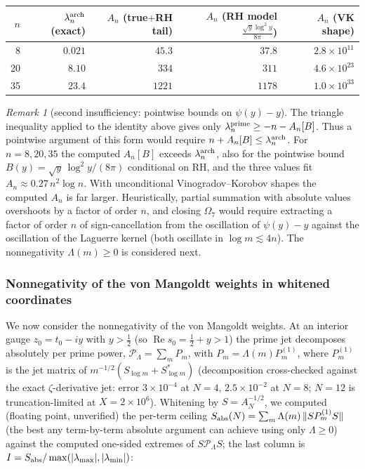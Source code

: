 \documentclass[11pt]{amsart}
\theoremstyle{definition}
\theoremstyle{remark}
\newtheorem{remark}[theorem]{Remark}
\theoremstyle{definition}
\renewcommand{\Re}{\operatorname{Re}}
\begin{document}
\begin{center}\small
\begin{tabular}{r|rrrr}
$n$ & $\lambda_n^{\rm arch}$ (exact) & $A_n$ (true$+$RH tail) & $A_n$ (RH model $\tfrac{\sqrt y\log^2y}{8\pi}$) & $A_n$ (VK shape) \\\hline
 8 & $0.021$ & $45.3$ & $37.8$ & $2.8\times10^{11}$\\
20 & $8.10$ & $334$  & $311$  & $4.6\times10^{23}$\\
35 & $23.4$ & $1221$ & $1178$ & $1.0\times10^{33}$\\
\end{tabular}
\end{center}

\begin{remark}[second insufficiency: pointwise bounds on $\psi(y)-y$]\label{rmk:pointwise-insufficient}
The triangle inequality applied to the identity above gives only
$\lambda_n^{\rm prime}\ge-n-A_n[B]$.  Thus a pointwise argument of this form would require
$n+A_n[B]\le\lambda_n^{\rm arch}$.  For $n=8,20,35$ the computed $A_n[B]$ exceeds $\lambda_n^{\rm arch}$, also for the
pointwise bound $B(y)=\sqrt y\,\log^2y/(8\pi)$ conditional on RH, and the three values fit
$A_n\approx0.27\,n^2\log n$.  With unconditional Vinogradov--Korobov shapes the computed $A_n$ is
far larger.  Heuristically, partial summation with absolute values overshoots by a factor of order
$n$, and closing $\Omega_7$ would require extracting a factor of order $n$ of sign-cancellation from the oscillation of $\psi(y)-y$ against the oscillation of the
Laguerre kernel (both oscillate in $\log m\lesssim4n$).  The nonnegativity $\Lambda(m)\ge0$ is considered next.
\end{remark}

\subsubsection*{Nonnegativity of the von Mangoldt weights in whitened coordinates}

We now consider the nonnegativity of the von Mangoldt weights.  At an
interior gauge $z_0=t_0-iy$ with $y>\tfrac12$ (so $\Re s_0=\tfrac12+y>1$) the prime jet decomposes
absolutely per prime power, $\mathcal P_\Lambda=\sum_m P_m$, with $P_m=\Lambda(m)P_m^{(1)}$, where
$P_m^{(1)}$ is the jet matrix of $m^{-1/2}(S_{\log m}+S_{\log m}^*)$ (decomposition cross-checked against the exact $\zeta$-derivative jet:
error $3\times10^{-4}$ at $N=4$, $2.5\times10^{-2}$ at $N=8$; $N=12$ is truncation-limited at
$X=2\times10^6$).  Whitening by $S=A_N^{-1/2}$, we computed (floating point, unverified) the per-term ceiling
$S_{\rm abs}(N)=\sum_m\Lambda(m)\,\|S P_m^{(1)}S\|$ (the best any term-by-term absolute argument can
achieve using only $\Lambda\ge0$) against the computed one-sided extremes of $S\mathcal P_\Lambda S$; the last column is
$I=S_{\rm abs}/\max(|\lambda_{\max}|,|\lambda_{\min}|)$:
\end{document}
